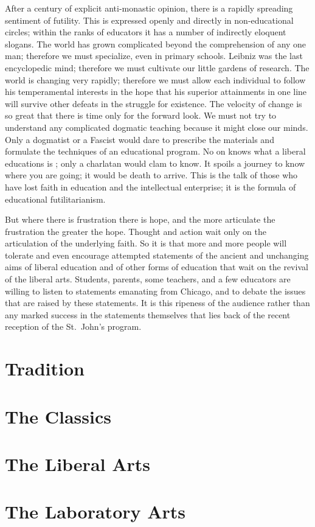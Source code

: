 \documentclass{memoir}
\begin{document}
After a century of explicit anti-monastic opinion, there is a rapidly
spreading sentiment of futility. This is expressed openly and directly
in non-educational circles; within the ranks of educators it has a
number of indirectly eloquent slogans. The world has grown complicated
beyond the comprehension of any one man; therefore we must specialize,
even in primary schools. Leibniz was the last encyclopedic mind;
therefore we must cultivate our little gardens of research. The world is
changing very rapidly; therefore we must allow each individual to follow
his temperamental interests in the hope that his superior attainments in
one line will survive other defeats in the struggle for existence. The
velocity of change is so great that  there is time only for the forward
look. We must not try to understand any complicated dogmatic teaching
because it might close our minds. Only a dogmatist or a Fascist
would dare to prescribe the materials and formulate the techniques of an
educational program. No on knows what a liberal educations is ; only a
charlatan would clam to know. It spoils a journey to know where you are
going; it would be death to arrive. This is the talk of those who have
lost faith in education and the intellectual enterprise; it is the
formula of educational futilitarianism. 

But where there is frustration there is hope, and the more articulate
the frustration the greater the hope. Thought and action wait only on
the articulation of the underlying faith. So it is that more and more
people will tolerate and even encourage attempted statements of the
ancient and unchanging aims of liberal education and of other forms of
education that wait on the revival of the liberal arts. Students,
parents, some teachers, and a few educators are willing to listen to
statements emanating from Chicago, and to debate the issues that are
raised by these statements. It is this ripeness of the audience rather
than any marked success in the statements themselves that lies back of
the recent reception of the St.\ John's program.
\chapter{Tradition}

\chapter{The Classics}
\chapter{The Liberal Arts}
\chapter{The Laboratory Arts}
\end{document}
